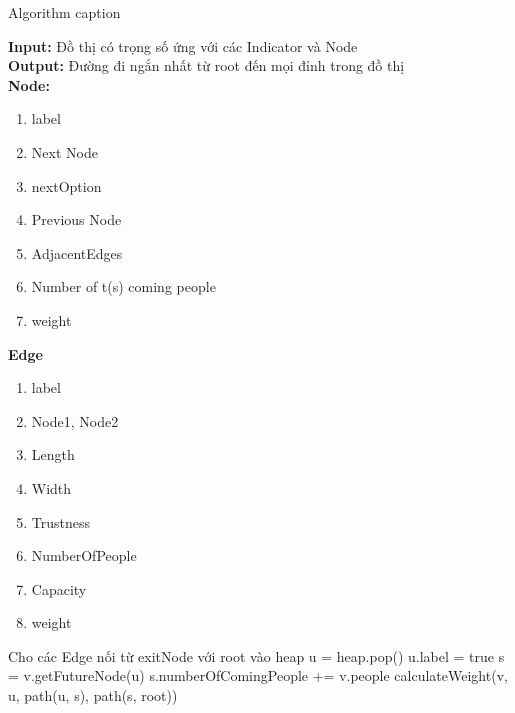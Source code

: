 \documentclass{article}
\begin{document}
    \begin{algorithm}
    \caption{Algorithm caption}
    \label{alg:algorithm-label}
    \textbf{Input:} Đồ thị có trọng số ứng với các Indicator và Node\\
    \textbf{Output:} Đường đi ngắn nhất từ root đến mọi đỉnh trong đồ thị\\ 
    \textbf{Node:} 
    \begin{enumerate}
        \item label
        \item Next Node
        \item nextOption
        \item Previous Node
        \item AdjacentEdges
        \item Number of t(s) coming people
        \item weight
    \end{enumerate}
    \textbf{Edge}
    \begin{enumerate}
        \item label
        \item Node1, Node2
        \item Length
        \item Width
        \item Trustness
        \item NumberOfPeople
        \item Capacity
        \item weight
    \end{enumerate}
    \begin{algorithmic}
        \State Cho các Edge nối từ exitNode với root vào heap
        \State u = heap.pop()
        \State u.label = true
        \State s = v.getFutureNode(u)
        \State s.numberOfComingPeople += v.people
        \State calculateWeight(v, u, path(u, s), path(s, root))
        \EndFor
        \EndWhile
    \EndProcedure
    \end{algorithmic}
    \end{algorithm}
    
    \begin{algorithm}
    
    \end{algorithm}
\end{document}
